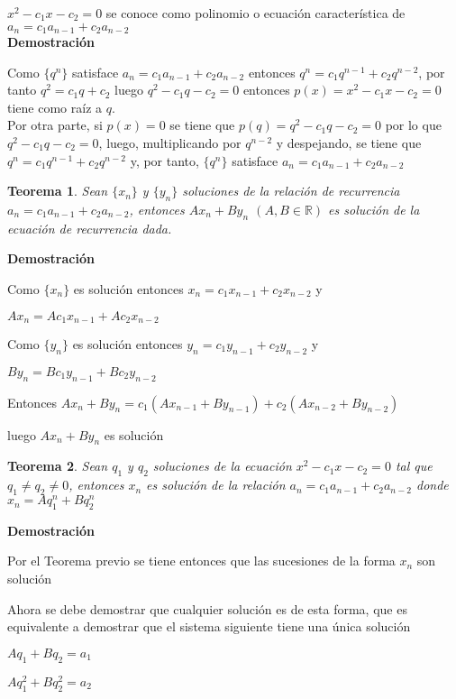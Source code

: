 \documentclass[a4paper,12pt]{report}
\newtheorem*{teo}{Teorema}
\begin{document}
  $x^2-c_1x-c_2=0$ se conoce como polinomio o ecuación característica de $a_n=c_1a_{n-1}+c_2a_{n-2}$ \\

  
   \textbf{Demostración}

   Como $\{q^n\}$ satisface $a_n=c_1a_{n-1}+c_2a_{n-2}$ entonces $q^n=c_1q^{n-1}+c_2q^{n-2}$, por tanto
   $q^2=c_1q+c_2$ luego $q^2-c_1q-c_2=0$ entonces $p(x)=x^2-c_1x-c_2=0$ tiene como raíz a $q$.\\
   
   Por otra parte, si $p(x)=0$ se tiene que $p(q)=q^2-c_1q-c_2=0$ por lo que $q^2-c_1q-c_2=0$, luego, multiplicando por $q^{n-2}$ y despejando, se tiene que 
   $q^n=c_1q^{n-1}+c_2q^{n-2}$ y, por tanto, $\{q^n\}$ satisface $a_n=c_1a_{n-1}+c_2a_{n-2}$
   
\begin{teo}
 Sean $\{x_n\}$ y $\{y_n\}$ soluciones de la relación de recurrencia\\ 
 $a_n=c_1a_{n-1}+c_2a_{n-2}$, entonces $Ax_n + By_n$  $(A,B\in\mathbb{R})$ es solución de la ecuación de recurrencia dada.
\end{teo}

\textbf{Demostración}

Como $\{x_n\}$ es solución entonces $x_n=c_1x_{n-1}+c_2x_{n-2}$ y

$Ax_n=Ac_1x_{n-1}+Ac_2x_{n-2}$

Como $\{y_n\}$ es solución entonces $y_n=c_1y_{n-1}+c_2y_{n-2}$ y

$By_n=Bc_1y_{n-1}+Bc_2y_{n-2}$

Entonces $Ax_n+By_n=c_1(Ax_{n-1}+By_{n-1})+c_2(Ax_{n-2}+By_{n-2})$

luego $Ax_n+By_n$ es solución

\begin{teo}
 Sean $q_1$ y $q_2$ soluciones de la ecuación $x^2-c_1x-c_2=0$ tal que $q_1\neq q_2 \neq 0$, entonces $x_n$ es solución de la relación $a_n=c_1a_{n-1}+c_2a_{n-2}$ donde $x_n=Aq^n_1+Bq^n_2$
\end{teo}

\textbf{Demostración}

Por el Teorema previo se tiene entonces que las sucesiones de la forma $x_n$ son solución

Ahora se debe demostrar que cualquier solución es de esta forma, que es equivalente a demostrar que el sistema siguiente tiene una única solución

$Aq_1+Bq_2=a_1$

$Aq^2_1+Bq^2_2=a_2$
\end{document}
